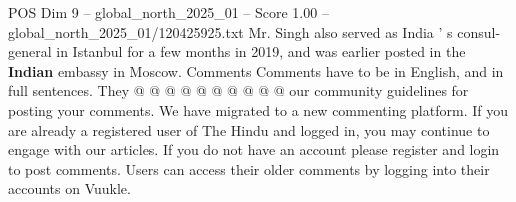 \begin{textsample}{POS Dim 9 – global\_north\_2025\_01 – Score 1.00 – global\_north\_2025\_01/120425925.txt}
Mr.
Singh also served as India ' s consul-general in Istanbul for a few months in 2019, and was earlier posted in the \textbf{Indian} embassy in Moscow.
Comments Comments have to be in English, and in full sentences.
They @ @ @ @ @ @ @ @ @ @ our community guidelines for posting your comments.
We have migrated to a new commenting platform.
If you are already a registered user of The Hindu and logged in, you may continue to engage with our articles.
If you do not have an account please register and login to post comments.
Users can access their older comments by logging into their accounts on Vuukle.

\end{textsample}
